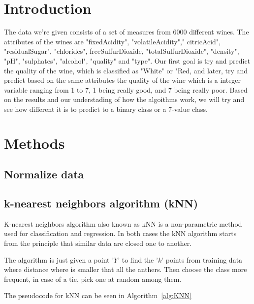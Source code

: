 \documentclass[twoside]{article}
\begin{document}
\begin{multicols}{2} %

\section{Introduction}
\indent \par
The data we're given consists of a set of measures from 6000 different wines. The attributes of the wines are "fixedAcidity", "volatileAcidity"," citricAcid", "residualSugar", "chlorides", freeSulfurDioxide, "totalSulfurDioxide", "density", "pH", "sulphates", "alcohol", "quality" and "type". Our first goal is try and predict the quality of the wine, which is classified as "White" or "Red, and later, try and predict based on the same attributes the quality of the wine which is a integer variable ranging from 1 to 7, 1 being really good, and 7 being really poor. Based on the results and our understading of how the algoithms work, we will try and see how different it is to predict to a binary class or a 7-value class.\\



\section{Methods}
\subsection*{Normalize data}

\subsection*{k-nearest neighbors algorithm (kNN)}
\indent \par
K-nearest neighbors algorithm also known as kNN is a non-parametric method used for classification and regression. In both cases the kNN algorithm starts from the principle that similar data are closed one to another.\par
The algorithm is just given a point '$Y$' to find the '$k$' points from training data where distance where is smaller that all the anthers. Then choose the class more frequent, in case of a tie, pick one at random among them.\par
The pseudocode for kNN can be seen in Algorithm~\ref{alg:KNN} \cite{CA}


\end{multicols}
\end{document}
